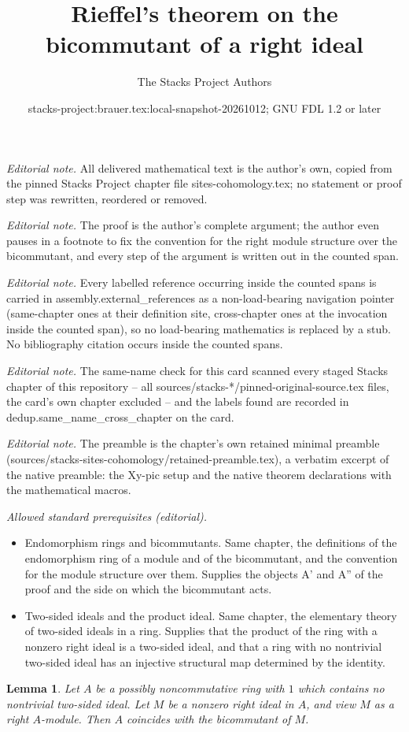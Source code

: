 \documentclass[10pt,a4paper]{amsart}
\title{Rieffel's theorem on the bicommutant of a right ideal}
\author{The Stacks Project Authors}
\date{stacks-project:brauer.tex:local-snapshot-20261012; GNU FDL 1.2 or later}
\theoremstyle{plain}
\newtheorem{lemma}[subsection]{Lemma}
\theoremstyle{definition}
\theoremstyle{remark}
\numberwithin{equation}{subsection}
\begin{document}
\maketitle
\noindent\textit{Editorial note.} All delivered mathematical text is the author's own, copied from the pinned Stacks Project chapter file sites-cohomology.tex; no statement or proof step was rewritten, reordered or removed.\par\medskip
\noindent\textit{Editorial note.} The proof is the author's complete argument; the author even pauses in a footnote to fix the convention for the right module structure over the bicommutant, and every step of the argument is written out in the counted span.\par\medskip
\noindent\textit{Editorial note.} Every labelled reference occurring inside the counted spans is carried in assembly.external\_references as a non-load-bearing navigation pointer (same-chapter ones at their definition site, cross-chapter ones at the invocation inside the counted span), so no load-bearing mathematics is replaced by a stub. No bibliography citation occurs inside the counted spans.\par\medskip
\noindent\textit{Editorial note.} The same-name check for this card scanned every staged Stacks chapter of this repository -- all sources/stacks-*/pinned-original-source.tex files, the card's own chapter excluded -- and the labels found are recorded in dedup.same\_name\_cross\_chapter on the card.\par\medskip
\noindent\textit{Editorial note.} The preamble is the chapter's own retained minimal preamble (sources/stacks-sites-cohomology/retained-preamble.tex), a verbatim excerpt of the native preamble: the Xy-pic setup and the native theorem declarations with the mathematical macros.\par\medskip
\noindent\textit{Allowed standard prerequisites (editorial).}\begin{itemize}
\item Endomorphism rings and bicommutants. Same chapter, the definitions of the endomorphism ring of a module and of the bicommutant, and the convention for the module structure over them. Supplies the objects A' and A'' of the proof and the side on which the bicommutant acts.
\item Two-sided ideals and the product ideal. Same chapter, the elementary theory of two-sided ideals in a ring. Supplies that the product of the ring with a nonzero right ideal is a two-sided ideal, and that a ring with no nontrivial two-sided ideal has an injective structural map determined by the identity.
\end{itemize}\medskip
\begin{lemma}
\label{lemma-rieffel}
Let $A$ be a possibly noncommutative ring with $1$ which contains no
nontrivial two-sided ideal. Let $M$ be a nonzero right ideal in $A$,
and view $M$ as a right $A$-module. Then $A$ coincides with the
bicommutant of $M$.
\end{lemma}
\end{document}
